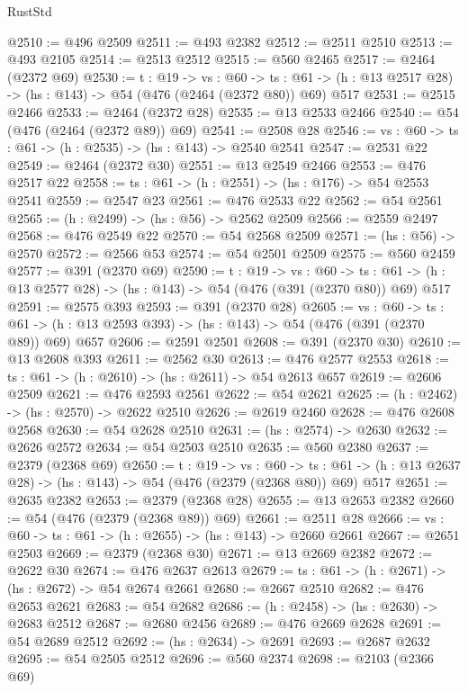\begin{lexlean}{RustStd}
\begin{coremodule}
@2510 := @496 @2509
@2511 := @493 @2382
@2512 := @2511 @2510
@2513 := @493 @2105
@2514 := @2513 @2512
@2515 := @560 @2465
@2517 := @2464 (@2372 @69)
@2530 := {t : @19} ->
  {vs : @60} ->
  {ts : @61} -> (h : @13 @2517 @28) -> (hs : @143) -> @54 (@476 (@2464 (@2372 @80)) @69) @517
@2531 := @2515 @2466
@2533 := @2464 (@2372 @28)
@2535 := @13 @2533 @2466
@2540 := @54 (@476 (@2464 (@2372 @89)) @69)
@2541 := @2508 @28
@2546 := {vs : @60} -> {ts : @61} -> (h : @2535) -> (hs : @143) -> @2540 @2541
@2547 := @2531 @22
@2549 := @2464 (@2372 @30)
@2551 := @13 @2549 @2466
@2553 := @476 @2517 @22
@2558 := {ts : @61} -> (h : @2551) -> (hs : @176) -> @54 @2553 @2541
@2559 := @2547 @23
@2561 := @476 @2533 @22
@2562 := @54 @2561
@2565 := (h : @2499) -> (hs : @56) -> @2562 @2509
@2566 := @2559 @2497
@2568 := @476 @2549 @22
@2570 := @54 @2568 @2509
@2571 := (hs : @56) -> @2570
@2572 := @2566 @53
@2574 := @54 @2501 @2509
@2575 := @560 @2459
@2577 := @391 (@2370 @69)
@2590 := {t : @19} ->
  {vs : @60} ->
  {ts : @61} -> (h : @13 @2577 @28) -> (hs : @143) -> @54 (@476 (@391 (@2370 @80)) @69) @517
@2591 := @2575 @393
@2593 := @391 (@2370 @28)
@2605 := {vs : @60} ->
  {ts : @61} -> (h : @13 @2593 @393) -> (hs : @143) -> @54 (@476 (@391 (@2370 @89)) @69) @657
@2606 := @2591 @2501
@2608 := @391 (@2370 @30)
@2610 := @13 @2608 @393
@2611 := @2562 @30
@2613 := @476 @2577 @2553
@2618 := {ts : @61} -> (h : @2610) -> (hs : @2611) -> @54 @2613 @657
@2619 := @2606 @2509
@2621 := @476 @2593 @2561
@2622 := @54 @2621
@2625 := (h : @2462) -> (hs : @2570) -> @2622 @2510
@2626 := @2619 @2460
@2628 := @476 @2608 @2568
@2630 := @54 @2628 @2510
@2631 := (hs : @2574) -> @2630
@2632 := @2626 @2572
@2634 := @54 @2503 @2510
@2635 := @560 @2380
@2637 := @2379 (@2368 @69)
@2650 := {t : @19} ->
  {vs : @60} ->
  {ts : @61} -> (h : @13 @2637 @28) -> (hs : @143) -> @54 (@476 (@2379 (@2368 @80)) @69) @517
@2651 := @2635 @2382
@2653 := @2379 (@2368 @28)
@2655 := @13 @2653 @2382
@2660 := @54 (@476 (@2379 (@2368 @89)) @69)
@2661 := @2511 @28
@2666 := {vs : @60} -> {ts : @61} -> (h : @2655) -> (hs : @143) -> @2660 @2661
@2667 := @2651 @2503
@2669 := @2379 (@2368 @30)
@2671 := @13 @2669 @2382
@2672 := @2622 @30
@2674 := @476 @2637 @2613
@2679 := {ts : @61} -> (h : @2671) -> (hs : @2672) -> @54 @2674 @2661
@2680 := @2667 @2510
@2682 := @476 @2653 @2621
@2683 := @54 @2682
@2686 := (h : @2458) -> (hs : @2630) -> @2683 @2512
@2687 := @2680 @2456
@2689 := @476 @2669 @2628
@2691 := @54 @2689 @2512
@2692 := (hs : @2634) -> @2691
@2693 := @2687 @2632
@2695 := @54 @2505 @2512
@2696 := @560 @2374
@2698 := @2103 (@2366 @69)

\end{coremodule}
\end{lexlean}

